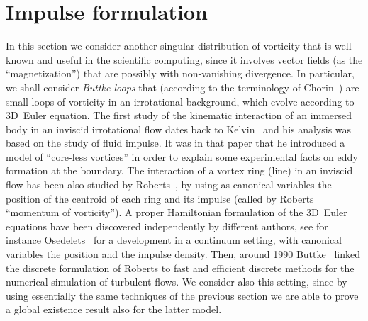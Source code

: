 \documentclass[a4paper,11pt]{article}
\numberwithin{equation}{section}
\begin{document}
\section{Impulse formulation}\label{Buttke_loops}
%
In this section we consider another singular distribution of vorticity
that is well-known and useful in the scientific computing, since it
involves vector fields (as the ``magnetization'') that are possibly
with non-vanishing divergence. In particular, we shall consider
\textit{Buttke loops} that (according to the terminology of
Chorin~\cite{MR95m:76043}) are small loops of vorticity in an
irrotational background, which evolve according to 3D~Euler
equation. The first study of the kinematic interaction of an
immersed body in an inviscid irrotational flow dates back to
Kelvin~\cite{Kelvin} and his analysis was based on the study of fluid
impulse. It was in that paper that he introduced a model of
``core-less vortices'' in order to explain some experimental facts on
eddy formation at the boundary.  The interaction of a vortex ring
(line) in an inviscid flow has been also studied by
Roberts~\cite{Roberts}, by using as canonical variables the position
of the centroid of each ring and its impulse (called by Roberts
``momentum of vorticity'').  A proper Hamiltonian formulation of the
3D~Euler equations have been 
discovered independently by different authors, see for instance
Osedelets~\cite{Osedelets} for a development in a continuum
setting, with canonical variables the position and the impulse
density. Then, around 1990 Buttke~\cite{MR1248421} linked the discrete
formulation of Roberts to fast and efficient discrete methods for the
numerical simulation of turbulent flows.  We consider also this
setting, since by using essentially the same techniques of the
previous section we are able to prove a global existence result also
for the latter model.\par
%
\end{document}

